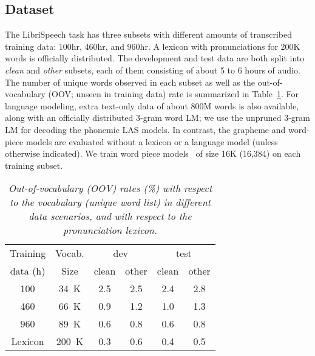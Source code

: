 \documentclass[a4paper]{article}
\begin{document}
\subsection{Dataset}
 \vspace{-1mm}
The LibriSpeech task \cite{panayotov2015librispeech} has three subsets with different amounts of
transcribed training data: 100hr, 460hr, and 960hr. A lexicon with pronunciations for 200K words
is officially distributed. The development and test data are both split into \textit{clean}
and \textit{other} subsets, each of them consisting of about 5 to 6 hours of audio. The number of unique words
observed in each subset as well as the out-of-vocabulary (OOV; unseen in training
data) rate is summarized in Table~\ref{tab:oov}.
For language modeling, extra text-only data of about 800M words is also
available, along with an officially distributed 3-gram word LM; we use the
unpruned 3-gram LM for decoding the phonemic LAS models.
In contrast, the grapheme and word-piece models are evaluated without a lexicon or a language model (unless otherwise indicated).
We train word piece models~\cite{SchusterN12} of size 16K (16,384) on each training subset.
\begin{table}[h]
	\centering
\caption{\it Out-of-vocabulary (OOV) rates (\%) with respect to the
	vocabulary (unique word list) in different data scenarios, and with respect to the pronunciation lexicon.}
	 \label{tab:oov}
	 	\vspace{-2mm}
	\begin{tabular}{ |c|c|c|c|c|c|} \hline
		Training  & Vocab.    & \multicolumn{2}{|c|}{dev} & \multicolumn{2}{|c|}{test}    \\ \cline{3-6}
		data (h)  & Size      & clean & other & clean & other    \\ \hline
		100   &  34~K &  2.5  & 2.5 & 2.4 & 2.8  \\
		460   &  66~K &  0.9  & 1.2 & 1.0 & 1.3  \\
		960   &  89~K &  0.6  & 0.8 & 0.6 & 0.8  \\  \hline \hline
		Lexicon  & 200~K   & 0.3  & 0.6 & 0.4 & 0.5  \\ \hline
	\end{tabular}
\vspace{-5mm}
\end{table}
\vspace{-2mm}
\end{document}
